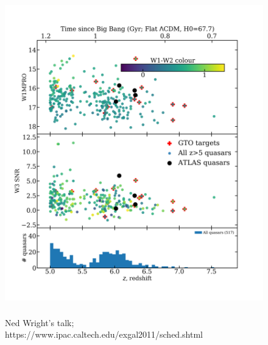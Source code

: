 
\hspace{-7.5cm}
\begin{figure}[h]
  \begin{center}
    \hspace{-0.5cm}
    \includegraphics[height=14.0cm,width=12.0cm]{W1W2_vs_redshift_20180308v1.png}
    \vspace{-10pt}
\caption{Ned Wright's talk; 
https://www.ipac.caltech.edu/exgal2011/sched.shtml}
    \label{figtest-fig}
  \end{center}
\end{figure}

